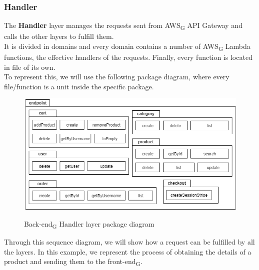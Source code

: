 \subsubsection{Handler}
The \textbf{Handler} layer manages the requests sent from AWS\textsubscript{G} API Gateway and calls the other layers to fulfill them.\\
It is divided in domains and every domain contains a number of AWS\textsubscript{G} Lambda functions, the effective handlers of the requests. Finally, every function is located in file of its own.\\
To represent this, we will use the following package diagram, where every file/function is a unit inside the specific package.

\begin{figure}[H]
\centering
\includegraphics[scale=0.65]{res/Architettura/Backend/img/handler_package}\\
\caption{Back-end\textsubscript{G} Handler layer package diagram}
\end{figure}

Through this sequence diagram, we will show how a request can be fulfilled by all the layers. In this example, we represent the process of obtaining the details of a product and sending them to the front-end\textsubscript{G}.

